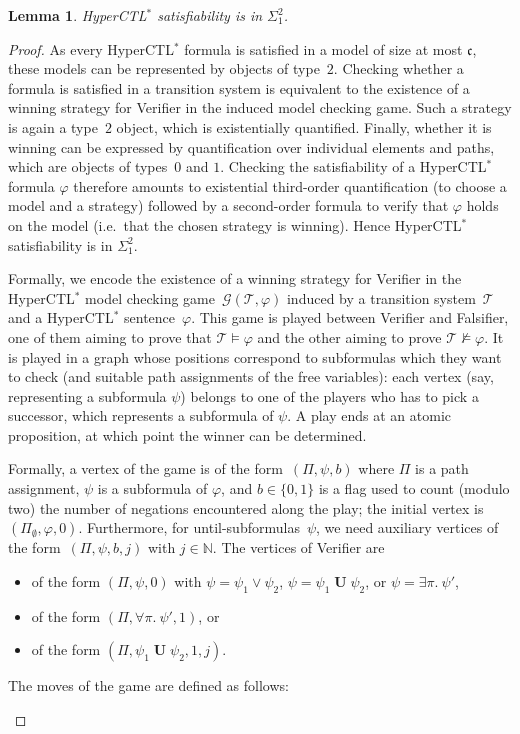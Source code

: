 \documentclass[dvipsnames,10pt,a4paper]{amsart}
\newtheorem{lem}[thm]{Lemma}
\theoremstyle{definition}
\theoremstyle{remark}
\newcommand{\mcgame}{\mathcal{G}}
\newcommand{\set}[1]{\{#1\}}
\newcommand{\nats}{\mathbb{N}}
\renewcommand{\phi}{\varphi}
\newcommand{\cont}{\mathfrak{c}}
\newcommand{\tsys}{\mathcal{T}}
\DeclareMathOperator{\U}{\mathbf{U}}
\newcommand{\hyctlstar}{{HyperCTL$^*$}\xspace}
\renewcommand{\phi}{\varphi}
\begin{document}
\begin{lem}\label{lemma:hyctl-membership}
\hyctlstar satisfiability is in $\Sigma_1^2$.
\end{lem}
\begin{proof}
As every \hyctlstar formula is satisfied in a model of size at most $\cont$, these models can be represented by objects of type~$2$. Checking whether a formula is satisfied in a transition system is equivalent to the existence of a winning strategy for Verifier in the induced model checking game. Such a strategy is again a type~$2$ object, which is existentially quantified. Finally, whether it is winning can be expressed by quantification over individual elements and paths, which are objects of types~$0$ and $1$.
Checking the satisfiability of a \hyctlstar formula $\phi$ therefore amounts to existential third-order quantification (to choose a model and a strategy) followed by a second-order formula to verify that $\phi$ holds on the model (i.e.\ that the chosen strategy is winning). Hence \hyctlstar satisfiability is in $\Sigma^2_1$.


Formally, we encode the existence of a winning strategy for Verifier in the \hyctlstar model checking game~$\mcgame(\tsys, \varphi)$ induced by a transition system~$\tsys$ and a \hyctlstar sentence~$\varphi$. 
This game is played between Verifier and Falsifier, one of them aiming to prove that $\tsys \models \varphi$ and the other aiming to prove $\tsys \not\models \varphi$. It is played in a graph whose positions correspond to subformulas which they want to check (and suitable path assignments of the free variables): each vertex (say, representing a subformula $\psi$) belongs to one of the players who has to pick a successor, which represents a subformula of $\psi$. A play ends at an atomic proposition, at which point the winner can be determined.

Formally, a vertex of the game is of the form~$(\Pi, \psi,b)$ where $\Pi$ is a path assignment, $\psi$ is a subformula of $\varphi$, and $b \in \set{0,1}$ is a flag used to count (modulo two) the number of negations encountered along the play; the initial vertex is $(\Pi_\emptyset, \varphi,0)$.
Furthermore, for until-subformulas~$\psi$, we need auxiliary vertices of the form~$(\Pi,\psi, b, j)$ with $j \in \nats$.
The vertices of Verifier are 
\begin{itemize}
	\item of the form $(\Pi, \psi, 0)$ with $\psi = \psi_1 \vee \psi_2$, $\psi = \psi_1 \U \psi_2$, or $\psi = \exists \pi.\ \psi'$, 
	\item of the form $(\Pi, \forall \pi.\ \psi', 1)$, or
	\item of the form $(\Pi, \psi_1 \U \psi_2, 1, j)$.
\end{itemize}
The moves of the game are defined as follows:
\begin{itemize}
	

\end{itemize}
\end{proof}
\end{document}
